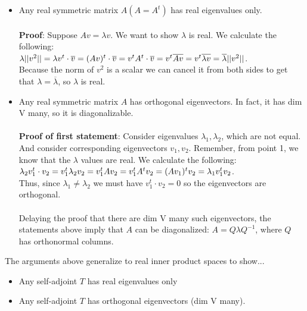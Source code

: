 \documentclass{article}
\begin{document}
\begin{itemize} 
\item Any real symmetric matrix $A (A = A^t)$ has real eigenvalues only. \\\\ 
\textbf{Proof}: Suppose $Av = \lambda v$. We want to show $\lambda$ is real. We calculate the following:\\
$\lambda ||v^2|| \\
= \lambda v^t \cdot \overline{v}\\
= (Av)^t \cdot \overline{v} \\
= v^t A^t \cdot \overline{v} \\
= v^t \overline{Av} \\
= v^t \overline{\lambda v} \\
= \overline{\lambda} ||v^2||$. \\
Because the norm of $v^2$ is a scalar we can cancel it from both sides to get that $\lambda = \overline{\lambda}$, so $\lambda$ is real. 
\item Any real symmetric matrix $A$ has orthogonal eigenvectors. In fact, it has dim V many, so it is diagonalizable. \\\\
\textbf{Proof of first statement}: Consider eigenvalues $\lambda_1, \lambda_2$, which are not equal. And consider corresponding eigenvectors $v_1, v_2$. Remember, from point 1, we know that the $\lambda$ values are real. We calculate the following: \\
$\lambda_2 v_1^t \cdot v_2 \\
= v_1^t \lambda_2 v_2 \\
= v_1^t Av_2 \\
= v_1^t A^t v_2 \\
= (Av_1)^t v_2 \\
= \lambda_1 v_1^t v_2$.\\
Thus, since $\lambda_1 \neq \lambda_2$ we must have $v_1^t \cdot v_2 = 0$ so the eigenvectors are orthogonal. \\\\
Delaying the proof that there are dim V many such eigenvectors, the statements above imply that $A$ can be diagonalized: $A = Q \lambda Q^{-1}$, where $Q$ has orthonormal columns. 
\end{itemize}
The arguments above generalize to real inner product spaces to show...
\begin{itemize}
    \item Any self-adjoint $T$ has real eigenvalues only 
    \item Any self-adjoint $T$ has orthogonal eigenvectors (dim V many). 
\end{itemize}
\end{document}
